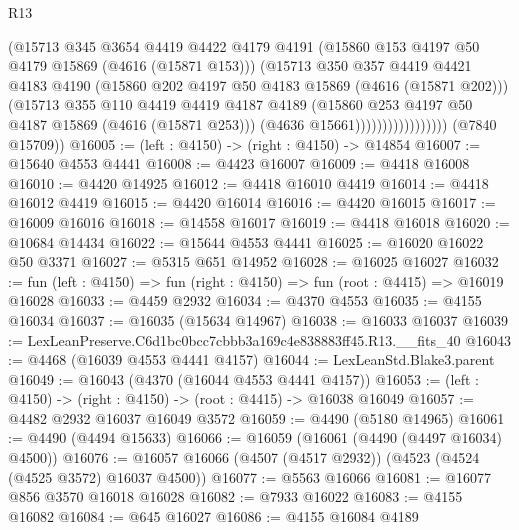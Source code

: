 \begin{lexlean}{R13}
\begin{coremodule}
                                (@15713
                                  @345
                                  @3654
                                  @4419
                                  @4422
                                  @4179
                                  @4191
                                  (@15860 @153 @4197 @50 @4179 @15869 (@4616 (@15871 @153)))
                                  (@15713
                                    @350
                                    @357
                                    @4419
                                    @4421
                                    @4183
                                    @4190
                                    (@15860 @202 @4197 @50 @4183 @15869 (@4616 (@15871 @202)))
                                    (@15713
                                      @355
                                      @110
                                      @4419
                                      @4419
                                      @4187
                                      @4189
                                      (@15860 @253 @4197 @50 @4187 @15869 (@4616 (@15871 @253)))
                                      (@4636 @15661)))))))))))))))))
      (@7840 @15709))
@16005 := (left : @4150) -> (right : @4150) -> @14854
@16007 := @15640 @4553 @4441
@16008 := @4423 @16007
@16009 := @4418 @16008
@16010 := @4420 @14925
@16012 := @4418 @16010 @4419
@16014 := @4418 @16012 @4419
@16015 := @4420 @16014
@16016 := @4420 @16015
@16017 := @16009 @16016
@16018 := @14558 @16017
@16019 := @4418 @16018
@16020 := @10684 @14434
@16022 := @15644 @4553 @4441
@16025 := @16020 @16022 @50 @3371
@16027 := @5315 @651 @14952
@16028 := @16025 @16027
@16032 := fun (left : @4150) => fun (right : @4150) => fun (root : @4415) => @16019 @16028
@16033 := @4459 @2932
@16034 := @4370 @4553
@16035 := @4155 @16034
@16037 := @16035 (@15634 @14967)
@16038 := @16033 @16037
@16039 := LexLeanPreserve.C6d1bc0bcc7cbbb3a169c4e838883ff45.R13.__fits_40
@16043 := @4468 (@16039 @4553 @4441 @4157)
@16044 := LexLeanStd.Blake3.parent
@16049 := @16043 (@4370 (@16044 @4553 @4441 @4157))
@16053 := (left : @4150) -> (right : @4150) -> (root : @4415) -> @16038 @16049
@16057 := @4482 @2932 @16037 @16049 @3572
@16059 := @4490 (@5180 @14965)
@16061 := @4490 (@4494 @15633)
@16066 := @16059 (@16061 (@4490 (@4497 @16034) @4500))
@16076 := @16057 @16066 (@4507 (@4517 @2932)) (@4523 (@4524 (@4525 @3572) @16037 @4500))
@16077 := @5563 @16066
@16081 := @16077 @856 @3570 @16018 @16028
@16082 := @7933 @16022
@16083 := @4155 @16082
@16084 := @645 @16027
@16086 := @4155 @16084 @4189

\end{coremodule}
\end{lexlean}
